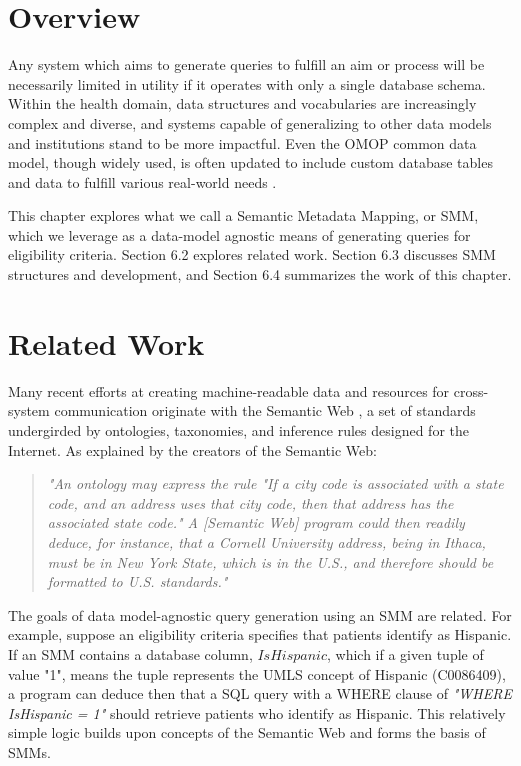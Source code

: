 \documentclass[../main.tex]{subfiles}
\begin{document}
\section{Overview}

Any system which aims to generate queries to fulfill an aim or process will be necessarily limited in utility if it operates with only a single database schema. Within the health domain, data structures and vocabularies are increasingly complex and diverse, and systems capable of generalizing to other data models and institutions stand to be more impactful. Even the OMOP common data model, though widely used, is often updated to include custom database tables and data to fulfill various real-world needs \cite{belenkaya2021extending, peng2021towards, zoch2021adaption, warner2019hemonc, zhou2013evaluation, shin2019genomic, kwon2019development}. 

This chapter explores what we call a Semantic Metadata Mapping, or SMM, which we leverage as a data-model agnostic means of generating queries for eligibility criteria. Section 6.2 explores related work. Section 6.3 discusses SMM structures and development, and Section 6.4 summarizes the work of this chapter.

\section{Related Work}

Many recent efforts at creating machine-readable data and resources for cross-system communication originate with the Semantic Web \cite{berners2001semantic}, a set of standards undergirded by ontologies, taxonomies, and inference rules designed for the Internet. As explained by the creators of the Semantic Web:

\begin{quote}
\textit{"An ontology may express the rule "If a city code is associated with a state code, and an address uses that city code, then that address has the associated state code." A [Semantic Web] program could then readily deduce, for instance, that a Cornell University address, being in Ithaca, must be in New York State, which is in the U.S., and therefore should be formatted to U.S. standards."}
\end{quote} \cite{berners2001semantic}

The goals of data model-agnostic query generation using an SMM are related. For example, suppose an eligibility criteria specifies that patients identify as Hispanic. If an SMM contains a database column, $IsHispanic$, which if a given tuple of value "1", means the tuple represents the UMLS concept of Hispanic (C0086409), a program can deduce then that a SQL query with a WHERE clause of \textit{"WHERE IsHispanic = 1"} should retrieve patients who identify as Hispanic. This relatively simple logic builds upon concepts of the Semantic Web and forms the basis of SMMs.
\end{document}
